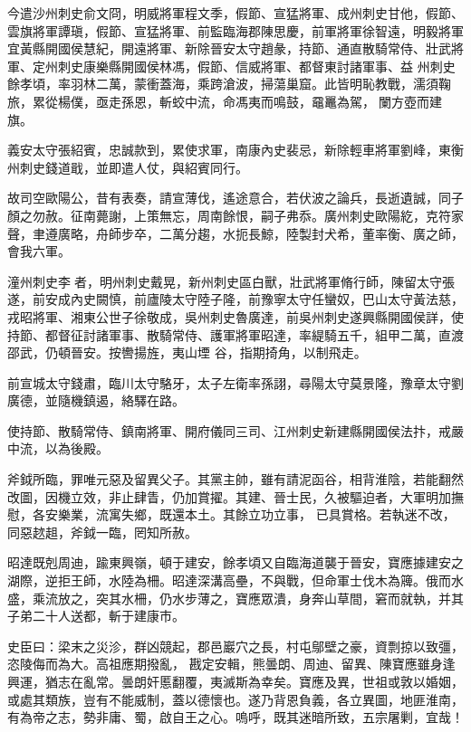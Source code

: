 \begin{pinyinscope}
 今遣沙州刺史俞文冏，明威將軍程文季，假節、宣猛將軍、成州刺史甘他，假節、雲旗將軍譚瑱，假節、宣猛將軍、前監臨海郡陳思慶，前軍將軍徐智遠，明毅將軍宜黃縣開國侯慧紀，開遠將軍、新除晉安太守趙彖，持節、通直散騎常侍、壯武將軍、定州刺史康樂縣開國侯林馮，假節、信威將軍、都督東討諸軍事、益
 州刺史餘孝頃，率羽林二萬，蒙衝蓋海，乘跨滄波，掃蕩巢窟。此皆明恥教戰，濡須鞠旅，累從楊僕，亟走孫恩，斬蛟中流，命馮夷而鳴鼓，黿鼉為駕，闌方壺而建旗。



 義安太守張紹賓，忠誠款到，累使求軍，南康內史裴忌，新除輕車將軍劉峰，東衡州刺史錢道戢，並即遣人仗，與紹賓同行。



 故司空歐陽公，昔有表奏，請宣薄伐，遙途意合，若伏波之論兵，長逝遺誠，同子顏之勿赦。征南薨謝，上策無忘，周南餘恨，嗣子弗忝。廣州刺史歐陽紇，克符家
 聲，聿遵廣略，舟師步卒，二萬分趨，水扼長鯨，陸製封犬希，董率衡、廣之師，會我六軍。



 潼州刺史李者，明州刺史戴晃，新州刺史區白獸，壯武將軍脩行師，陳留太守張遂，前安成內史闕慎，前廬陵太守陸子隆，前豫寧太守任蠻奴，巴山太守黃法慈，戎昭將軍、湘東公世子徐敬成，吳州刺史魯廣達，前吳州刺史遂興縣開國侯詳，使持節、都督征討諸軍事、散騎常侍、護軍將軍昭達，率緹騎五千，組甲二萬，直渡邵武，仍頓晉安。按轡揚旌，夷山堙
 谷，指期掎角，以制飛走。



 前宣城太守錢肅，臨川太守駱牙，太子左衛率孫詡，尋陽太守莫景隆，豫章太守劉廣德，並隨機鎮遏，絡驛在路。



 使持節、散騎常侍、鎮南將軍、開府儀同三司、江州刺史新建縣開國侯法抃，戒嚴中流，以為後殿。



 斧鉞所臨，罪唯元惡及留異父子。其黨主帥，雖有請泥函谷，相背淮陰，若能翻然改圖，因機立效，非止肆眚，仍加賞擢。其建、晉士民，久被驅迫者，大軍明加撫慰，各安樂業，流寓失鄉，既還本土。其餘立功立事，
 已具賞格。若執迷不改，同惡趑趄，斧鉞一臨，罔知所赦。



 昭達既剋周迪，踰東興嶺，頓于建安，餘孝頃又自臨海道襲于晉安，寶應據建安之湖際，逆拒王師，水陸為柵。昭達深溝高壘，不與戰，但命軍士伐木為簰。俄而水盛，乘流放之，突其水柵，仍水步薄之，寶應眾潰，身奔山草間，窘而就執，并其子弟二十人送都，斬于建康市。



 史臣曰：梁末之災沴，群凶競起，郡邑巖穴之長，村屯鄔壁之豪，資剽掠以致彊，恣陵侮而為大。高祖應期撥亂，
 戡定安輯，熊曇朗、周迪、留異、陳寶應雖身逢興運，猶志在亂常。曇朗奸慝翻覆，夷滅斯為幸矣。寶應及異，世祖或敦以婚姻，或處其類族，豈有不能威制，蓋以德懷也。遂乃背恩負義，各立異圖，地匪淮南，有為帝之志，勢非庸、蜀，啟自王之心。嗚呼，既其迷暗所致，五宗屠剿，宜哉！



\end{pinyinscope}